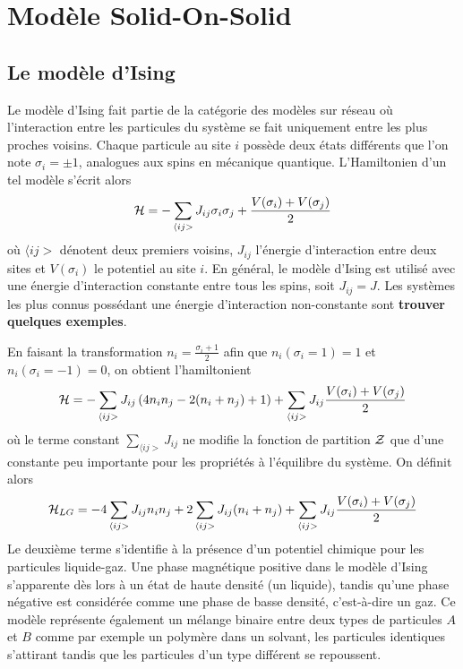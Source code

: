 \chapter{Modèle Solid-On-Solid}
		  \section{Le modèle d'Ising}
  
  	Le modèle d'Ising fait partie de la catégorie des modèles sur réseau où l'interaction entre les particules du système se fait uniquement entre les plus proches voisins. Chaque particule au site $i$ possède deux états différents que l'on note $\sigma_i = \pm 1$, analogues aux spins en mécanique quantique. L'Hamiltonien d'un tel modèle s'écrit alors
\begin{equation}
	\mathcal{H} =  - \sum_{\langle i j >} J_{ij} \sigma_i \sigma_j + \frac{V(\sigma_i)+V(\sigma_j)}{2}
\end{equation}
où $\langle ij >$ dénotent deux premiers voisins, $J_{ij}$ l'énergie d'interaction entre deux sites et $V(\sigma_i)$ le potentiel au site $i$.
En général, le modèle d'Ising est utilisé avec une énergie d'interaction constante entre tous les spins, soit $J_{ij} = J$. Les systèmes les plus connus possédant une énergie d'interaction non-constante sont  \textbf{trouver quelques exemples}.

En faisant la transformation\cite{ref23David} $n_i =  \frac{\sigma_i +1}{2}$ afin que $n_i(\sigma_i = 1) = 1$ et $n_i(\sigma_i = -1) = 0$, on obtient l'hamiltonient
\begin{equation}
	\mathcal{H} =  - \sum_{\langle i j >}  J_{ij} \left( 4 n_i n_j -2 ( n_i+n_j) + 1 \right)+ \sum_{\langle i j >}  J_{ij} \frac{V(\sigma_i)+V(\sigma_j)}{2}  
\end{equation}
où le terme constant $\sum_{\langle i j >}  J_{ij}$ ne modifie la fonction de partition $\mathcal{Z}$ que d'une constante peu importante pour les propriétés à l'équilibre du système. On définit alors 
\begin{equation}
	\mathcal{H}_{LG} =  - 4 \sum_{\langle i j >}  J_{ij}  n_i n_j  + 2 \sum_{\langle i j >}  J_{ij}  (n_i+n_j) + \sum_{\langle i j >}  J_{ij} \frac{V(\sigma_i)+V(\sigma_j)}{2}  
\end{equation}
Le deuxième terme s'identifie à la présence d'un potentiel chimique pour les particules liquide-gaz. Une phase magnétique positive dans le modèle d'Ising s'apparente dès lors à un état de haute densité (un liquide), tandis qu'une phase négative est considérée comme une phase de basse densité, c'est-à-dire un gaz.
Ce modèle représente également un mélange binaire\cite{} entre deux types de particules $A$ et $B$ comme par exemple un polymère dans un solvant, les particules identiques s'attirant tandis que les particules d'un type différent se repoussent. 

